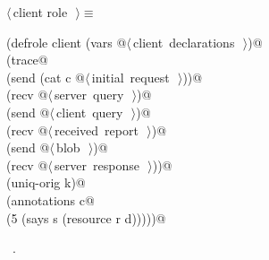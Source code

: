 \documentclass[titlepage,12pt]{article}
\theoremstyle{definition}
\begin{document}
\begin{flushleft} \small
\begin{minipage}{\linewidth} \label{scrap15}
$\langle\,$client role\nobreak\ {\footnotesize {}}$\,\rangle\equiv$
\vspace{-1ex}
\begin{list}{}{} \item
\mbox{}\verb@(defrole client (vars @\hbox{$\langle\,$client declarations\nobreak\ {\footnotesize {}}$\,\rangle$}\verb@)@\\
\mbox{}\verb@ (trace@\\
\mbox{}\verb@   (send (cat c @\hbox{$\langle\,$initial request\nobreak\ {\footnotesize {}}$\,\rangle$}\verb@))@\\
\mbox{}\verb@   (recv @\hbox{$\langle\,$server query\nobreak\ {\footnotesize {}}$\,\rangle$}\verb@)@\\
\mbox{}\verb@   (send @\hbox{$\langle\,$client query\nobreak\ {\footnotesize {}}$\,\rangle$}\verb@)@\\
\mbox{}\verb@   (recv @\hbox{$\langle\,$received report\nobreak\ {\footnotesize {}}$\,\rangle$}\verb@)@\\
\mbox{}\verb@   (send @\hbox{$\langle\,$blob\nobreak\ {\footnotesize {}}$\,\rangle$}\verb@)@\\
\mbox{}\verb@   (recv @\hbox{$\langle\,$server response\nobreak\ {\footnotesize {}}$\,\rangle$}\verb@))@\\
\mbox{}\verb@ (uniq-orig k)@\\
\mbox{}\verb@ (annotations c@\\
\mbox{}\verb@   (5 (says s (resource r d)))))@{\NWsep}
\end{list}
\vspace{-1ex}
\footnotesize\addtolength{\baselineskip}{-1ex}
\begin{list}{}{\setlength{\itemsep}{-\parsep}\setlength{\itemindent}{-\leftmargin}}
\item \NWtxtMacroRefIn\ .
\end{list}
\end{minipage}\\[4ex]
\end{flushleft}
\end{document}
